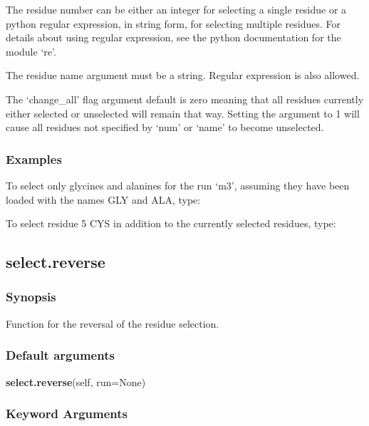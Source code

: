 The residue number can be either an integer for selecting a single residue or a python
regular expression, in string form, for selecting multiple residues.  For details about
using regular expression, see the python documentation for the module `re'.

The residue name argument must be a string.  Regular expression is also allowed.

The `change\_all' flag argument default is zero meaning that all residues currently either
selected or unselected will remain that way.  Setting the argument to 1 will cause all
residues not specified by `num' or `name' to become unselected.


\subsubsection{Examples}

To select only glycines and alanines for the run `m3', assuming they have been loaded with
the names GLY and ALA, type:


To select residue 5 CYS in addition to the currently selected residues, type:





\newpage

\subsection{select.reverse}


\subsubsection{Synopsis}

Function for the reversal of the residue selection.

\subsubsection{Default arguments}

\textsf{\textbf{select.reverse}(self, run=None)}


\subsubsection{Keyword Arguments}

